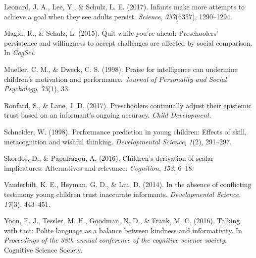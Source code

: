 \documentclass[10pt, letterpaper]{article}
\begin{document}
\hypertarget{ref-leonard2017infants}{}
Leonard, J. A., Lee, Y., \& Schulz, L. E. (2017). Infants make more
attempts to achieve a goal when they see adults persist. \emph{Science},
\emph{357}(6357), 1290--1294.

\hypertarget{ref-magid2015quit}{}
Magid, R., \& Schulz, L. (2015). Quit while you're ahead: Preschoolers'
persistence and willingness to accept challenges are affected by social
comparison. In \emph{CogSci}.

\hypertarget{ref-mueller1998praise}{}
Mueller, C. M., \& Dweck, C. S. (1998). Praise for intelligence can
undermine children's motivation and performance. \emph{Journal of
Personality and Social Psychology}, \emph{75}(1), 33.

\hypertarget{ref-ronfard2017preschoolers}{}
Ronfard, S., \& Lane, J. D. (2017). Preschoolers continually adjust
their epistemic trust based on an informant's ongoing accuracy.
\emph{Child Development}.

\hypertarget{ref-schneider1998performance}{}
Schneider, W. (1998). Performance prediction in young children: Effects
of skill, metacognition and wishful thinking. \emph{Developmental
Science}, \emph{1}(2), 291--297.

\hypertarget{ref-skordos2016children}{}
Skordos, D., \& Papafragou, A. (2016). Children's derivation of scalar
implicatures: Alternatives and relevance. \emph{Cognition}, \emph{153},
6--18.

\hypertarget{ref-vanderbilt2014absence}{}
Vanderbilt, K. E., Heyman, G. D., \& Liu, D. (2014). In the absence of
conflicting testimony young children trust inaccurate informants.
\emph{Developmental Science}, \emph{17}(3), 443--451.

\hypertarget{ref-yoon2016talking}{}
Yoon, E. J., Tessler, M. H., Goodman, N. D., \& Frank, M. C. (2016).
Talking with tact: Polite language as a balance between kindness and
informativity. In \emph{Proceedings of the 38th annual conference of the
cognitive science society}. Cognitive Science Society.
\end{document}
